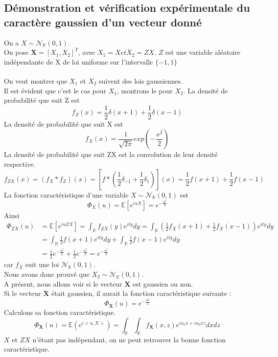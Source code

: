 \documentclass{report}
\begin{document}
		\subsection{Démonstration et vérification expérimentale du caractère gaussien d'un vecteur donné}
			On a $X \sim \mathcal{N}_{\mathbb{R}}(0, 1)$.\\
			On pose $\textbf{X} = [X_1, X_2]^T$, avec $X_1 = X et X_2 = ZX$.
			$Z$ est une variable aléatoire indépendante de X de loi uniforme sur l'intervalle $\{-1, 1\}$\\
			\\
			On veut montrer que $X_1$ et $X_2$ suivent des lois gaussiennes.\\
			Il est évident que c'est le cas pour $X_1$, montrons le pour $X_2$.
			La densité de probabilité que suit Z est
			\[ f_Z(x) = \frac{1}{2}\delta(x+1) + \frac{1}{2}\delta(x-1) \]
			La densité de probabilité que suit X est
			\[ f_X(x) = \frac{1}{\sqrt{2\pi}} exp(-\frac{x^2}{2}) \]
			La densité de probabilité que suit ZX est la convolution de leur densité respective.
			\[ f_{ZX}(x) = (f_X \ast f_Z)(x) = [f \ast (\frac{1}{2}\delta_{-1} + \frac{1}{2}\delta_{1})](x) = \frac{1}{2}f(x+1) + \frac{1}{2}f(x-1) \]
			La fonction caractéristique d'une variable $X \sim \mathcal{N}_{\mathbb{R}}(0, 1)$ est 
			\[ \Phi_X(u) = \mathbb{E}[e^{iuX}] = e^{-\frac{u^2}{2}} \]
			Ainsi
			\begin{align*}
				\Phi_{ZX}(u) &= \mathbb{E}[e^{iuZX}] = \int_{\mathbb{R}}f_{ZX}(y)e^{ity}dy = \int_{\mathbb{R}}(\frac{1}{2}f_X(x+1) + \frac{1}{2}f_X(x-1))e^{ity}dy\\
				&= \int_{\mathbb{R}}\frac{1}{2}f(x+1)e^{ity}dy + \int_{\mathbb{R}}\frac{1}{2}f(x-1)e^{ity}dy\\
				&= \frac{1}{2}e^{-\frac{u^2}{2}} + \frac{1}{2}e^{-\frac{u^2}{2}} = e^{-\frac{u^2}{2}}
			\end{align*}
			car $f_X$ suit une loi $\mathcal{N}_{\mathbb{R}}(0, 1)$.\\
			Nous avons donc prouvé que $X_2 \sim \mathcal{N}_{\mathbb{R}}(0, 1)$.\\
			A présent, nous allons voir si le vecteur $\textbf{X}$ est gaussien ou non.\\
			Si le vecteur $\textbf{X}$ était gaussien, il aurait la fonction caractéristique suivante :
			\[ \Phi_{\textbf{X}}(u) = e^{-\frac{u^2}{2}} \]
			Calculons sa fonction caractéristique.
			\[ \Phi_{\textbf{X}}(u) = \mathbb{E}(e^{i<u,X>}) = \int_{\mathbb{R}}\int_{\mathbb{R}}f_{\textbf{X}}(x,z)e^{iu_1x + iu_2xz}dxdz \]
			$X$ et $ZX$ n'étant pas indépendant, on ne peut retrouver la bonne fonction caractéristique.\\
\end{document}
